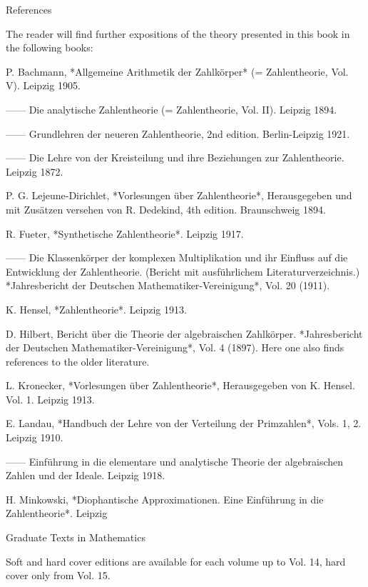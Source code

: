References

The reader will find further expositions of the theory presented in this book in the following books:

P. Bachmann, *Allgemeine Arithmetik der Zahlkörper* (= Zahlentheorie, Vol. V). Leipzig 1905.

—— Die analytische Zahlentheorie (= Zahlentheorie, Vol. II). Leipzig 1894.

—— Grundlehren der neueren Zahlentheorie, 2nd edition. Berlin-Leipzig 1921.

—— Die Lehre von der Kreisteilung und ihre Beziehungen zur Zahlentheorie. Leipzig 1872.

P. G. Lejeune-Dirichlet, *Vorlesungen über Zahlentheorie*, Herausgegeben und mit Zusätzen versehen von R. Dedekind, 4th edition. Braunschweig 1894.

R. Fueter, *Synthetische Zahlentheorie*. Leipzig 1917.

—— Die Klassenkörper der komplexen Multiplikation und ihr Einfluss auf die Entwicklung der Zahlentheorie. (Bericht mit ausführlichem Literaturverzeichnis.) *Jahresbericht der Deutschen Mathematiker-Vereinigung*, Vol. 20 (1911).

K. Hensel, *Zahlentheorie*. Leipzig 1913.

D. Hilbert, Bericht über die Theorie der algebraischen Zahlkörper. *Jahresbericht der Deutschen Mathematiker-Vereinigung*, Vol. 4 (1897). Here one also finds references to the older literature.

L. Kronecker, *Vorlesungen über Zahlentheorie*, Herausgegeben von K. Hensel. Vol. 1. Leipzig 1913.

E. Landau, *Handbuch der Lehre von der Verteilung der Primzahlen*, Vols. 1, 2. Leipzig 1910.

—— Einführung in die elementare und analytische Theorie der algebraischen Zahlen und der Ideale. Leipzig 1918.

H. Minkowski, *Diophantische Approximationen. Eine Einführung in die Zahlentheorie*. Leipzig

Graduate Texts in Mathematics

Soft and hard cover editions are available for each volume up to Vol. 14, hard cover only from Vol. 15.

